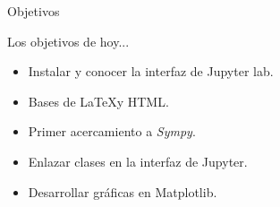 \begin{frame}[t]{Objetivos}\vspace{10pt}

Los objetivos de hoy...

\begin{itemize}
	\item Instalar y conocer la interfaz de Jupyter lab.
	\item Bases de \LaTeX y HTML.
	\item Primer acercamiento a \textit{Sympy}.
	\item Enlazar clases en la interfaz de Jupyter.
	\item Desarrollar gr\'aficas en Matplotlib.
\end{itemize}

\end{frame}